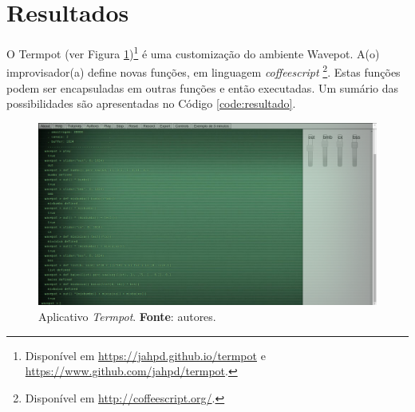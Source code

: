 \section{Resultados}\label{sec:termpot}

O Termpot (ver Figura \ref{fig:termpot})\footnote{Disponível em \url{https://jahpd.github.io/termpot} e \url{https://www.github.com/jahpd/termpot}.} é uma customização do ambiente Wavepot. A(o) improvisador(a) define novas funções, em linguagem \emph{coffeescript} \cite{burnham2011coffeescript}\footnote{Disponível em \url{http://coffeescript.org/}.}. Estas funções  podem ser encapsuladas em outras funções e então executadas. Um sumário das possibilidades são apresentadas no Código \ref{code:resultado}.

\begin{figure}[!h]
\centering
\includegraphics[scale=0.3]{termpot.png}
\caption{Aplicativo \emph{Termpot}. \textbf{Fonte}: autores.}
\label{fig:termpot}
\end{figure}

